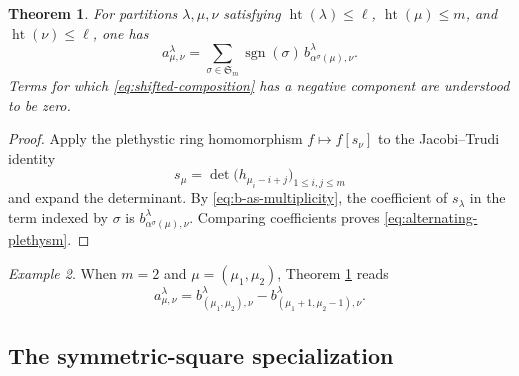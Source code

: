 \documentclass[11pt]{amsart}
\newtheorem{theorem}{Theorem}[section]
\theoremstyle{definition}
\theoremstyle{remark}
\newtheorem{example}[theorem]{Example}
\newcommand{\htp}{\operatorname{ht}}
\newcommand{\frakS}{\mathfrak S}
\begin{document}
\begin{theorem}
\label{thm:alternating-plethysm}
For partitions $\lambda,\mu,\nu$ satisfying
$\htp(\lambda)\leq\ell$, $\htp(\mu)\leq m$, and
$\htp(\nu)\leq\ell$, one has
\begin{equation}
 a_{\mu,\nu}^{\lambda}
 =
 \sum_{\sigma\in\frakS_m}
 \operatorname{sgn}(\sigma)\,
 b_{\alpha^\sigma(\mu),\nu}^{\lambda}.
 \label{eq:alternating-plethysm}
\end{equation}
Terms for which \eqref{eq:shifted-composition} has a negative component are
understood to be zero.
\end{theorem}

\begin{proof}
Apply the plethystic ring homomorphism $f\mapsto f[s_\nu]$ to the
Jacobi--Trudi identity
\[ s_\mu=\det\bigl(h_{\mu_i-i+j}\bigr)_{1\le i,j\le m} \]
and expand the determinant.  By \eqref{eq:b-as-multiplicity},
the coefficient of $s_\lambda$ in the term indexed by $\sigma$ is
$b_{\alpha^\sigma(\mu),\nu}^{\lambda}$.  Comparing coefficients proves
\eqref{eq:alternating-plethysm}.
\end{proof}

\begin{example}
When $m=2$ and $\mu=(\mu_1,\mu_2)$, Theorem
\ref{thm:alternating-plethysm} reads
\[ a_{\mu,\nu}^{\lambda} = b_{(\mu_1,\mu_2),\nu}^{\lambda} - b_{(\mu_1+1,\mu_2-1),\nu}^{\lambda}. \]
\end{example}

\subsection{The symmetric-square specialization}
\end{document}
